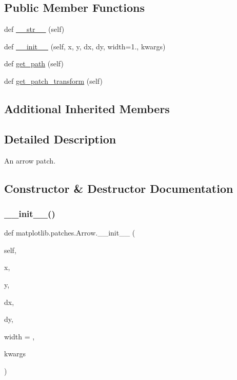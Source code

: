 \subsection*{Public Member Functions}
\begin{DoxyCompactItemize}
\item 
def \hyperlink{classmatplotlib_1_1patches_1_1Arrow_a05fe187eeb22e5ff7ffd70d82820217a}{\+\_\+\+\_\+str\+\_\+\+\_\+} (self)
\item 
def \hyperlink{classmatplotlib_1_1patches_1_1Arrow_a991822c5c2c0fd390d25be6497a4cfc3}{\+\_\+\+\_\+init\+\_\+\+\_\+} (self, x, y, dx, dy, width=1., kwargs)
\item 
def \hyperlink{classmatplotlib_1_1patches_1_1Arrow_a48a0d6100c44ee1f1217ad7c5bddb0a9}{get\+\_\+path} (self)
\item 
def \hyperlink{classmatplotlib_1_1patches_1_1Arrow_adec2c8469548cab188a1443647a381db}{get\+\_\+patch\+\_\+transform} (self)
\end{DoxyCompactItemize}
\subsection*{Additional Inherited Members}


\subsection{Detailed Description}
\begin{DoxyVerb}An arrow patch.\end{DoxyVerb}
 

\subsection{Constructor \& Destructor Documentation}
\mbox{\label{classmatplotlib_1_1patches_1_1Arrow_a991822c5c2c0fd390d25be6497a4cfc3}} 
\subsubsection{\texorpdfstring{\+\_\+\+\_\+init\+\_\+\+\_\+()}{\_\_init\_\_()}}
{\footnotesize\ttfamily def matplotlib.\+patches.\+Arrow.\+\_\+\+\_\+init\+\_\+\+\_\+ (\begin{DoxyParamCaption}\item[{}]{self,  }\item[{}]{x,  }\item[{}]{y,  }\item[{}]{dx,  }\item[{}]{dy,  }\item[{}]{width = {},  }\item[{}]{kwargs }\end{DoxyParamCaption})}

